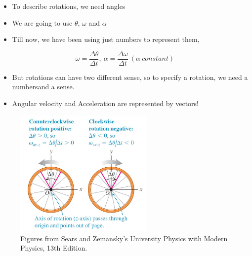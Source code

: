 \documentclass[]{beamer}
\begin{document}
    
     \begin{frame}
   
    

      \begin{itemize}
          \item  To describe rotations, we need angles
          \pause
          \item We are going to use $\theta$, $\omega$ and $\alpha$
          \pause
          \item Till now, we have been using just numbers to represent them,

      \end{itemize}
    
      \begin{equation*}
        \omega = \frac{\Delta \theta}{\Delta t},\ \alpha=\frac{\Delta \omega}{\Delta t} \ (\alpha \ constant)
      \end{equation*}

       \pause


       \begin{itemize}
        \item  But rotations can have two different sense, so to specify a rotation, we need a numbersand a
         sense.
         \item Angular velocity and Acceleration are represented by vectors!

    \end{itemize}

         \end{frame}
    

         \begin{frame}
     
        
    

    
         \begin{figure}[h!]  
            \includegraphics[width=0.6\textwidth]{images/12.jpg}
            \caption{ {\tiny Figures from Sears and Zemansky's University Physics 
            with Modern Physics, 13th Edition.} }
          \end{figure}
    
    
        
        
             \end{frame}
        
\end{document}
